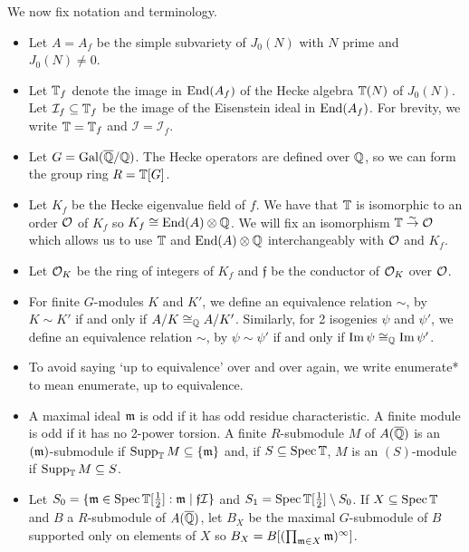 \documentclass{article}
\begin{document}
We now fix notation and terminology. 
\begin{itemize}
    \item
        Let $A=A_f$ be the simple subvariety of $J_0(N)$ with $N$ prime and
        $J_0(N)\neq 0$.
    \item
        Let $\mathbb{T}_f$ denote the image in $\operatorname{End}(A_f)$ of the Hecke algebra $\mathbb{T}(N)$
        of $J_0(N)$. Let $\mathcal{I}_f\subseteq \mathbb{T}_f$ be the image of the
        Eisenstein ideal in $\operatorname{End}(A_f)$. For brevity, we write $\mathbb{T}=\mathbb{T}_f$ and
        $\mathcal{I}=\mathcal{I}_f$.
    \item
        Let $G=\operatorname{Gal}(\overline{\mathbb{Q}}/\mathbb{Q})$. The Hecke operators are defined over $\mathbb{Q}$,
        so we can form the group ring $R=\mathbb{T}[G]$.
    \item
        Let $K_f$ be the Hecke eigenvalue field of $f$. We have that $\mathbb{T}$ is
        isomorphic to an order $\mathcal{O}$ of $K_f$ so $K_f\cong \operatorname{End}(A)\otimes \mathbb{Q}$.
        We will fix an isomorphism $\mathbb{T}\overset{\sim}{\to} \mathcal{O}$ which allows us
        to use $\mathbb{T}$ and $\operatorname{End}(A)\otimes \mathbb{Q}$ interchangeably with $\mathcal{O}$ and
        $K_f$.
    \item
        Let $\mathcal{O}_K$ be the ring of integers of $K_f$ and $\mathfrak{f}$ be the
        conductor of $\mathcal{O}_K$ over $\mathcal{O}$.
    \item
        For finite $G$-modules $K$ and $K'$, we define an equivalence relation
        $\sim$, by $K\sim K'$ if and only if $A/K\cong_{\mathbb{Q}} A/K'$. Similarly,
        for 2 isogenies $\psi$ and $\psi'$, we define an equivalence relation
        $\sim$, by $\psi\sim \psi'$ if and only if $\operatorname{Im} \psi \cong_{\mathbb{Q}} \operatorname{Im}
        \psi'$.
    \item
        To avoid saying `up to equivalence' over and over again, we write
        enumerate* to mean enumerate, up to equivalence.
    \item
        A maximal ideal $\mathfrak{m}$ is odd if it has odd residue characteristic. A
        finite module is odd if it has no 2-power torsion. A finite
        $R$-submodule $M$ of $A(\overline{\mathbb{Q}})$ is an $(\mathfrak{m})$-submodule if $\operatorname{Supp}_{\mathbb{T}} M
        \subseteq \{\mathfrak{m}\}$ and, if $S\subseteq \operatorname{Spec} \mathbb{T}$, $M$ is an
        $(S)$-module if $\operatorname{Supp}_{\mathbb{T}} M\subseteq S$.
    \item
        Let $S_0=\{\mathfrak{m}\in \operatorname{Spec}\mathbb{T}[\frac 12]: \mathfrak{m} \mid
        \mathfrak{f}\mathcal{I}\}$ and $S_1 = \operatorname{Spec}\mathbb{T}[\frac
        12]\setminus S_0$. If $X\subseteq \operatorname{Spec} \mathbb{T}$ and $B$ a
        $R$-submodule of $A(\overline{\mathbb{Q}})$, let $B_X$ be the maximal $G$-submodule of
        $B$ supported only on elements of $X$ so $B_X=B[(\prod_{\mathfrak{m}\in X}
        \mathfrak{m})^\infty]$.
\end{itemize}
\end{document}
